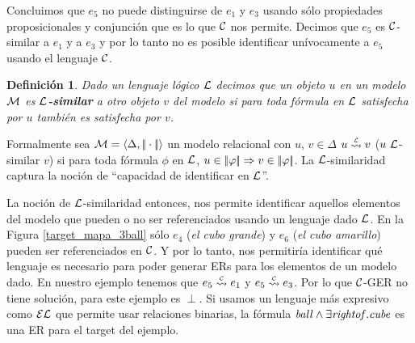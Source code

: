 Concluimos que $e_5$ no puede distinguirse de $e_1$ y $e_3$ usando s\'olo propiedades proposicionales y conjunci\'on que es lo que $\mathcal{C}$ nos permite. Decimos que $e_5$ es $\mathcal{C}$-similar a $e_1$ y a $e_3$ y por lo tanto no es posible identificar un\'ivocamente a $e_5$ usando el lenguaje $\mathcal{C}$.
\newtheorem{definicion}{Definici\'on}
\begin{definicion}

Dado un lenguaje l\'ogico $\mathcal{L}$ decimos que un objeto $u$ en un modelo
$\mathcal{M}$ es {\bf $\mathcal{L}$-similar} a otro objeto
 $v$ del modelo si para toda f\'ormula en $\mathcal{L}$ satisfecha por $u$ tambi\'en es satisfecha por $v$. 
\end{definicion}


Formalmente sea $\mathcal{M} = \langle \Delta, |\!|\cdot|\!| \rangle$ un modelo relacional con $u$, $v \in \Delta$
$u \simil{\+L} v$ ($u~\mathcal{L}$-similar $v$) si para toda f\'ormula $\phi$ en $\mathcal{L}$, $u \in |\!|\varphi|\!| \Rightarrow v \in |\!|\varphi|\!|$. 
La $\mathcal{L}$-similaridad captura la noci\'on de ``capacidad de identificar en $\mathcal{L}$''. 

%
%
%

La noci\'on de $\mathcal{L}$-similaridad entonces, nos permite identificar aquellos elementos del modelo que pueden o no ser referenciados usando un lenguaje dado $\mathcal{L}$. En 
la Figura \ref{target_mapa_3ball} s\'olo $e_4$ ({\it el cubo grande}) y $e_6$ ({\it el cubo amarillo}) pueden ser referenciados en $\mathcal{C}$. Y por lo tanto, nos permitir\'ia identificar qu\'e lenguaje es necesario para poder generar ERs para los elementos de un modelo dado. En nuestro ejemplo tenemos que $e_5 \simil{\+C} e_1$ y $e_5 \simil{\+C} e_3$. Por lo que $\mathcal{C}$-GER no tiene soluci\'on, para este ejemplo es $\perp$. Si usamos un lenguaje m\'as expresivo como $\mathcal{EL}$ que permite usar relaciones binarias, la f\'ormula $\mathit{ball} \land \exists\mathit{rightof}. \mathit{cube}$ es una ER para el target del ejemplo. 

